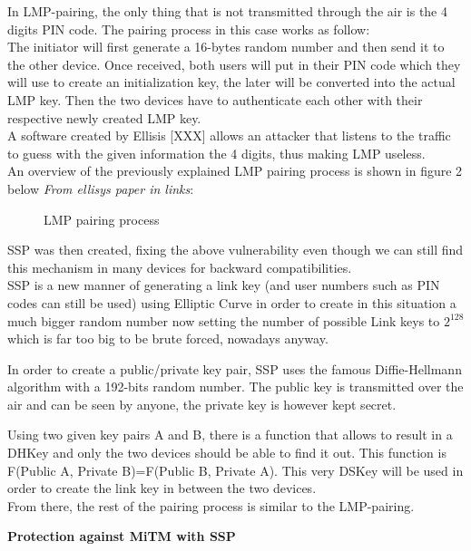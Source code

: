 In LMP-pairing, the only thing that is not transmitted through the air is the 4 digits PIN code. The pairing process in this case works as follow: \\
The initiator will first generate a 16-bytes random number and then send it to the other device. Once received, both users will put in their PIN code which they will use to create an initialization key, the later will be converted into the actual LMP key. Then the two devices have to authenticate each other with their respective newly created LMP key. \\
A software created by Ellisis [XXX] allows an attacker that listens to the traffic to guess with the given information the 4 digits, thus making LMP useless. \\
An overview of the previously explained LMP pairing process is shown in figure 2 below \textit{From ellisys paper in links}: 
\begin{figure}[!h]
  \begin{center}
	\label{LMP pairing}
	\caption{LMP pairing process}
  \end{center}
\end{figure}


SSP was then created, fixing the above vulnerability even though we can still find this mechanism in many devices for backward compatibilities. \\
SSP is a new manner of generating a link key (and user numbers such as PIN codes can still be used) using Elliptic Curve in order to create in this situation a much bigger random number now setting the number of possible Link keys to \(2^{128}\) which is far too big to be brute forced, nowadays anyway. 

In order to create a public/private key pair, SSP uses the famous Diffie-Hellmann algorithm with a 192-bits random number. The public key is transmitted over the air and can be seen by anyone, the private key is however kept secret. 

Using two given key pairs A and B, there is a function that allows to result in a DHKey and only the two devices should be able to find it out. This function is F(Public A, Private B)=F(Public B, Private A). This very DSKey will be used in order to create the link key in between the two devices. \\ 
From there, the rest of the pairing process is similar to the LMP-pairing.


\textbf{Protection against MiTM with SSP}

